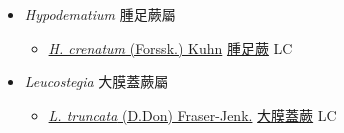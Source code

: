 
  \begin{itemize}
 \item[] \textit{Hypodematium} 腫足蕨屬
                    
  \begin{itemize}
        \item[] \href{http://www.theplantlist.org/tpl1.1/search?q=Hypodematium+crenatum}{\textit{H. crenatum} (Forssk.) Kuhn}   \href{\detokenize{http://taibnet.sinica.edu.tw/chi/taibnet_species_list.php?T2=腫足蕨&T2_new_value=true&fr=y}}{腫足蕨} LC
  \end{itemize}
 \item[] \textit{Leucostegia} 大膜蓋蕨屬
                    
  \begin{itemize}
        \item[] \href{http://www.theplantlist.org/tpl1.1/search?q=Leucostegia+truncata}{\textit{L. truncata} (D.Don) Fraser-Jenk.}     \href{\detokenize{http://taibnet.sinica.edu.tw/chi/taibnet_species_list.php?T2=大膜蓋蕨&T2_new_value=true&fr=y}}{大膜蓋蕨} LC
  \end{itemize}
  \end{itemize}
